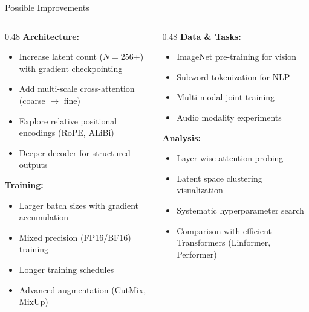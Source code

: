 \documentclass[aspectratio=169,11pt]{beamer}
\begin{document}
\begin{frame}[shrink=9]{Possible Improvements}
  \begin{columns}[T]
    \begin{column}{0.48\textwidth}
      \textbf{Architecture:}
      \begin{itemize}
        \item Increase latent count ($N = 256$+) with gradient checkpointing
        \item Add multi-scale cross-attention (coarse $\rightarrow$ fine)
        \item Explore relative positional encodings (RoPE, ALiBi)
        \item Deeper decoder for structured outputs
      \end{itemize}

      \vspace{0.5em}
      \textbf{Training:}
      \begin{itemize}
        \item Larger batch sizes with gradient accumulation
        \item Mixed precision (FP16/BF16) training
        \item Longer training schedules
        \item Advanced augmentation (CutMix, MixUp)
      \end{itemize}
    \end{column}
    \begin{column}{0.48\textwidth}
      \textbf{Data \& Tasks:}
      \begin{itemize}
        \item ImageNet pre-training for vision
        \item Subword tokenization for NLP
        \item Multi-modal joint training
        \item Audio modality experiments
      \end{itemize}

      \vspace{0.5em}
      \textbf{Analysis:}
      \begin{itemize}
        \item Layer-wise attention probing
        \item Latent space clustering visualization
        \item Systematic hyperparameter search
        \item Comparison with efficient Transformers (Linformer, Performer)
      \end{itemize}
    \end{column}
  \end{columns}
\end{frame}
\end{document}
